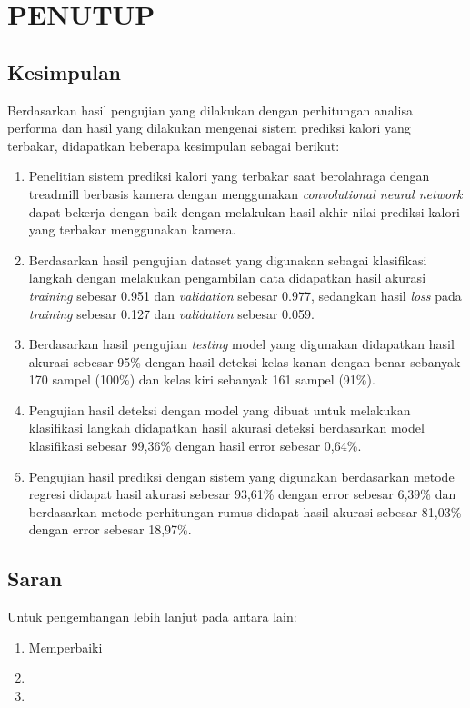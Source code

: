 \chapter{PENUTUP}
\label{chap:penutup}


\section{Kesimpulan}
\label{sec:kesimpulan}

Berdasarkan hasil pengujian yang dilakukan dengan perhitungan analisa performa dan hasil yang dilakukan mengenai sistem prediksi kalori yang terbakar, didapatkan beberapa kesimpulan sebagai berikut:

\begin{enumerate}[nolistsep]

  \item Penelitian sistem prediksi kalori yang terbakar saat berolahraga dengan treadmill berbasis kamera dengan menggunakan \emph{convolutional neural network} dapat bekerja dengan baik dengan melakukan hasil akhir nilai prediksi kalori yang terbakar menggunakan kamera.

  \item Berdasarkan hasil pengujian dataset yang digunakan sebagai klasifikasi langkah dengan melakukan pengambilan data didapatkan hasil akurasi \emph{training} sebesar 0.951 dan \emph{validation} sebesar 0.977, sedangkan hasil \emph{loss} pada \emph{training} sebesar 0.127 dan \emph{validation} sebesar 0.059.

  \item Berdasarkan hasil pengujian \emph{testing} model yang digunakan didapatkan hasil akurasi sebesar 95\% dengan hasil deteksi kelas kanan dengan benar sebanyak 170 sampel (100\%) dan kelas kiri sebanyak 161 sampel (91\%).

  \item Pengujian hasil deteksi dengan model yang dibuat untuk melakukan klasifikasi langkah didapatkan hasil akurasi deteksi berdasarkan model klasifikasi sebesar 99,36\% dengan hasil error sebesar 0,64\%.
  
  \item Pengujian hasil prediksi dengan sistem yang digunakan berdasarkan metode regresi didapat hasil akurasi sebesar 93,61\% dengan error sebesar 6,39\% dan berdasarkan metode perhitungan rumus didapat hasil akurasi sebesar 81,03\% dengan error sebesar 18,97\%.

\end{enumerate}

\section{Saran}
\label{chap:saran}

Untuk pengembangan lebih lanjut pada \lipsum[1][1-3] antara lain:

\begin{enumerate}[nolistsep]

  \item Memperbaiki \lipsum[2][1-3]

  \item \lipsum[2][4-6]

  \item \lipsum[2][7-10]

\end{enumerate}
